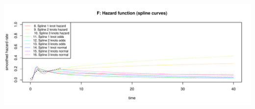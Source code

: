 \documentclass[
]{article}
\begin{document}
\begin{flushleft}\includegraphics[height=0.29\textheight]{Images/validate_extrapolation2-6} \end{flushleft}

\begin{table}


\end{table}
\end{document}
